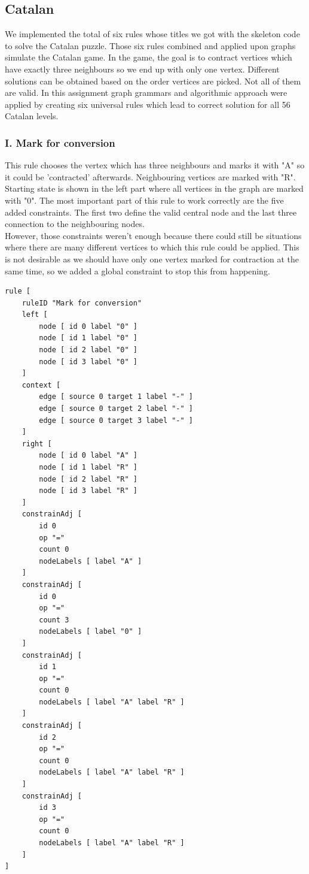 \documentclass[a4paper,10pt,titlepage]{report}
\begin{document}
\newpage

\subsection{Catalan}

We implemented the total of six rules whose titles we got with the skeleton code to solve the Catalan puzzle. Those six rules combined and applied upon graphs simulate the Catalan game. In the game, the goal is to contract vertices which have exactly three neighbours so we end up with only one vertex. Different solutions can be obtained based on the order vertices are picked. Not all of them are valid. In this assignment graph grammars and algorithmic approach were applied by creating six universal rules which lead to correct solution for all 56 Catalan levels. 

\subsubsection{I. Mark for conversion}

This rule chooses the vertex which has three neighbours and marks it with "A" so it could be 'contracted' afterwards. Neighbouring vertices are marked with "R". Starting state is shown in the left part where all vertices in the graph are marked with "0". The most important part of this rule to work correctly are the five added constraints. The first two define the valid central node and the last three connection to the neighbouring nodes. \\
However, those constraints weren't enough because there could still be situations where there are many different vertices to which this rule could be applied. This is not desirable as we should have only one vertex marked for contraction at the same time, so we added a global constraint to stop this from happening. 

\begin{lstlisting}
rule [
	ruleID "Mark for conversion"
	left [
		node [ id 0 label "0" ]
		node [ id 1 label "0" ]
		node [ id 2 label "0" ]
		node [ id 3 label "0" ]
	]
	context [
		edge [ source 0 target 1 label "-" ]
		edge [ source 0 target 2 label "-" ]
		edge [ source 0 target 3 label "-" ]
	]
	right [
		node [ id 0 label "A" ]
		node [ id 1 label "R" ]
		node [ id 2 label "R" ]
		node [ id 3 label "R" ]
	]
	constrainAdj [
        id 0
		op "="
		count 0
		nodeLabels [ label "A" ]
	]
	constrainAdj [
		id 0
		op "="
		count 3
		nodeLabels [ label "0" ]
	]
	constrainAdj [
		id 1
		op "="
		count 0
		nodeLabels [ label "A" label "R" ]
	]
	constrainAdj [
		id 2
		op "="
		count 0
		nodeLabels [ label "A" label "R" ]
	]
	constrainAdj [
		id 3
		op "="
		count 0
		nodeLabels [ label "A" label "R" ]
	]
]
\end{lstlisting}
\end{document}
